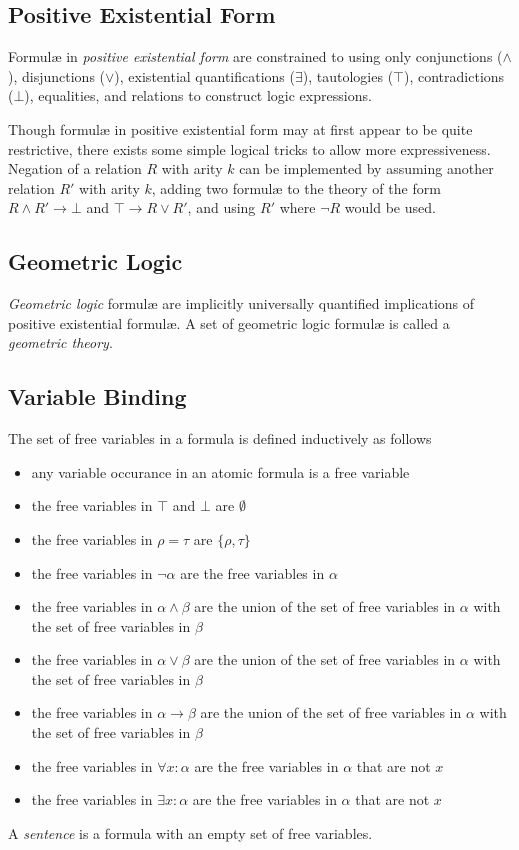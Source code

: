 	\subsection{Positive Existential Form}

		Formul{\ae} in \emph{positive existential form} are constrained to using
		only conjunctions ($\wedge$), disjunctions ($\vee$), existential
		quantifications ($\exists$), tautologies ($\top$), contradictions
		($\bot$), equalities, and relations to construct logic expressions.

		Though formul{\ae} in positive existential form may at first appear to
		be quite restrictive, there exists some simple logical tricks to allow
		more expressiveness. Negation of a relation $R$ with arity $k$ can be
		implemented by assuming another relation $R'$ with arity $k$, adding
		two formul{\ae} to the theory of the form $R \wedge R' \to \bot$ and
		$\top \to R \vee R'$, and using $R'$ where $\neg R$ would be used.

	\subsection{Geometric Logic}

		\emph{Geometric logic} formul{\ae} are implicitly universally
		quantified implications of positive existential formul{\ae}. A set of
		geometric logic formul{\ae} is called a \emph{geometric theory}.

	\subsection{Variable Binding}

		The set of free variables in a formula is defined inductively as follows
		\begin{itemize}
		\item any variable occurance in an atomic formula is a free variable
		\item the free variables in $\top$ and $\bot$ are $\emptyset$
		\item the free variables in $\rho = \tau$ are $\{\rho,\tau\}$
		\item the free variables in $\neg\alpha$ are the free variables in $\alpha$
		\item the free variables in $\alpha \wedge \beta$ are the union of the set of free variables in $\alpha$ with the set of free variables in $\beta$
		\item the free variables in $\alpha \vee   \beta$ are the union of the set of free variables in $\alpha$ with the set of free variables in $\beta$
		\item the free variables in $\alpha \to    \beta$ are the union of the set of free variables in $\alpha$ with the set of free variables in $\beta$
		\item the free variables in $\forall x : \alpha$ are the free variables in $\alpha$ that are not $x$
		\item the free variables in $\exists x : \alpha$ are the free variables in $\alpha$ that are not $x$
		\end{itemize}
		A \emph{sentence} is a formula with an empty set of free variables.

